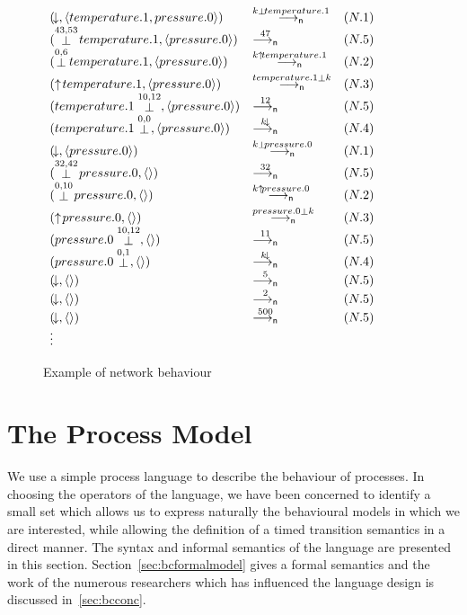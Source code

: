\begin{figure}
\begin{center}
\begin{math}
\begin{array}{lll}
(\free,\langle temperature.1,pressure.0 \rangle) 
& \goesn{\kk\preact{}temperature.1} & (N.1) \\
(\preact{43,53}{temperature.1},\langle pressure.0 \rangle)
& \goesn{47} & (N.5) \\
(\preact{0,6}{temperature.1},\langle pressure.0 \rangle)
& \goesn{\kk\offers{temperature.1}} & (N.2) \\
(\offers{temperature.1},\langle pressure.0 \rangle)
& \goesn{\postact{}{temperature.1}\kk} & (N.3) \\
(\postact{10,12}{temperature.1},\langle pressure.0 \rangle)
& \goesn{12} & (N.5) \\
(\postact{0,0}{temperature.1},\langle pressure.0 \rangle)
& \goesn{\kk\free} & (N.4) \\
(\free,\langle pressure.0 \rangle)
& \goesn{\kk\preact{}pressure.0} & (N.1) \\
(\preact{32,42}{pressure.0},\emq)
& \goesn{32} & (N.5) \\
(\preact{0,10}{pressure.0},\emq)
& \goesn{\kk\offers{pressure.0}} & (N.2) \\
(\offers{pressure.0},\emq)
& \goesn{\postact{}{pressure.0}\kk} & (N.3) \\
(\postact{10,12}{pressure.0},\emq)
& \goesn{11} & (N.5) \\
(\postact{0,1}{pressure.0},\emq)
& \goesn{\kk\free} & (N.4) \\
(\free,\emq)
& \goesn{5} & (N.5) \\
(\free,\emq)
& \goesn{2} & (N.5) \\
(\free,\emq)
& \goesn{500} & (N.5) \\
\vdots
\end{array}
\end{math}
\end{center}
\caption{Example of network behaviour\label{fig:bcnetbehaviour}}
\end{figure}

\section{The Process Model \label{sec:bcprocesses}}
We use a simple process language to describe the behaviour of
processes.  In choosing the operators of the language, we have been
concerned to identify a small set which allows us to express naturally
the behavioural models in which we are interested, while allowing the
definition of a timed transition semantics in a direct manner. The
syntax and informal semantics of the language are presented in this
section. Section~\ref{sec:bcformalmodel} gives a formal semantics
and the work of the numerous researchers which has influenced the
language design is discussed in~\Sec\ref{sec:bcconc}.
 
